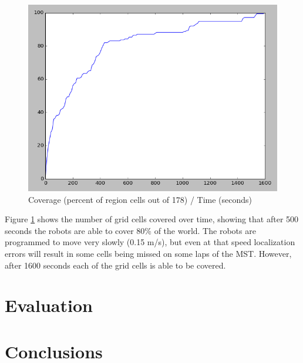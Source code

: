 \documentclass[10pt,a4paper]{article}
\begin{document}
\begin{figure}
	\includegraphics[width=\columnwidth]{dec_t2_line_percent.png}
	\caption{Coverage (percent of region cells out of 178) / Time (seconds)}
    \label{fig:decLine}
\end{figure}

Figure \ref{fig:decLine} shows the number of grid cells covered over time, showing that after 500 seconds the robots are able to cover 80\% of the world. The robots are programmed to move very slowly (0.15 m/s), but even at that speed localization errors will result in some cells being missed on some laps of the MST. However, after 1600 seconds each of the grid cells is able to be covered.


\section{Evaluation}
\section{Conclusions}
\end{document}
